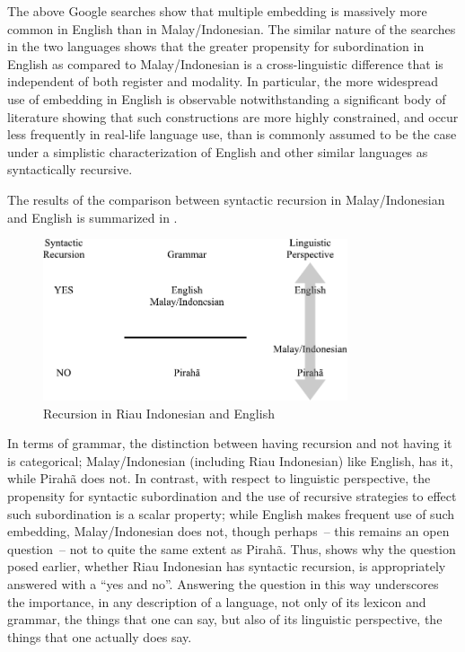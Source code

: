 \documentclass[output=paper,colorlinks,citecolor=brown
]{langscibook}
\begin{document}
The above Google searches show that multiple embedding is massively more common in English than in Malay\slash Indonesian.  The similar nature of the searches in the two languages shows that the greater propensity for subordination in English as compared to Malay\slash Indonesian is  a cross-linguistic difference that is independent of both register and modality.  In particular, the more widespread use of embedding in English is observable notwithstanding a significant body of literature \citep{karlsson2007aconstraints,karlsson2007bconstraints,karlsson2009aorigin,karlsson2009bsyntactic} showing that such constructions are more highly constrained, and occur less frequently in real-life language use, than is commonly assumed to be the case under a simplistic characterization of English and other similar languages as syntactically recursive.

\begin{sloppypar}
The results of the comparison between syntactic recursion in Malay\slash Indonesian and English is summarized in .
\end{sloppypar}

\begin{figure}
\includegraphics[width=0.8\textwidth]{gil_figure5.pdf}
\caption{\label{fig:gil:fig5}Recursion in Riau Indonesian and English}
\end{figure}

In terms of grammar, the distinction between having recursion and not having it is categorical; Malay\slash Indonesian (including Riau Indonesian) like English, has it, while Pirahã does not.  In contrast, with respect to linguistic perspective, the propensity for syntactic subordination and the use of recursive strategies to effect such subordination is a scalar property; while English makes frequent use of such embedding, Malay\slash Indonesian does not, though perhaps~– this remains an open question~– not to quite the same extent as Pirahã.  Thus,  shows why the question posed earlier, whether Riau Indonesian has syntactic recursion, is appropriately answered with a ``yes and no''.  Answering the question in this way underscores the importance, in any description of a language, not only of its lexicon and grammar, the things that one can say, but also of its linguistic perspective, the things that one actually does say.
\end{document}
